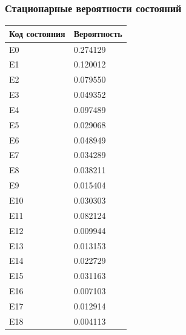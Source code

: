 \subsubsection{Стационарные вероятности состояний}

\begin{tabular}{|l|l|}
\hline
Код состояния & Вероятность \\ \hline
E0 & 0.274129 \\ \hline
E1 & 0.120012 \\ \hline
E2 & 0.079550 \\ \hline
E3 & 0.049352 \\ \hline
E4 & 0.097489 \\ \hline
E5 & 0.029068 \\ \hline
E6 & 0.048949 \\ \hline
E7 & 0.034289 \\ \hline
E8 & 0.038211 \\ \hline
E9 & 0.015404 \\ \hline
E10 & 0.030303 \\ \hline
E11 & 0.082124 \\ \hline
E12 & 0.009944 \\ \hline
E13 & 0.013153 \\ \hline
E14 & 0.022729 \\ \hline
E15 & 0.031163 \\ \hline
E16 & 0.007103 \\ \hline
E17 & 0.012914 \\ \hline
E18 & 0.004113 \\ \hline
\end{tabular}


